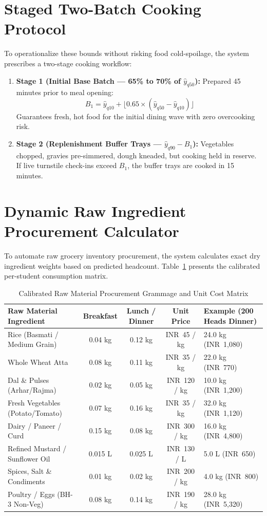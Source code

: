 \documentclass[11pt,a4paper,oneside]{report}
\newcommand{\inr}{\textsf{INR~}}
\begin{document}
\section{Staged Two-Batch Cooking Protocol}
To operationalize these bounds without risking food cold-spoilage, the system prescribes a two-stage cooking workflow:
\begin{enumerate}
  \item \textbf{Stage 1 (Initial Base Batch --- 65\% to 70\% of $\hat{y}_{q50}$):} Prepared 45 minutes prior to meal opening:
  $$B_1 = \hat{y}_{q10} + \lfloor 0.65 \times (\hat{y}_{q50} - \hat{y}_{q10}) \rfloor$$
  Guarantees fresh, hot food for the initial dining wave with zero overcooking risk.
  \item \textbf{Stage 2 (Replenishment Buffer Trays --- $\hat{y}_{q90} - B_1$):} Vegetables chopped, gravies pre-simmered, dough kneaded, but cooking held in reserve. If live turnstile check-ins exceed $B_1$, the buffer trays are cooked in 15 minutes.
\end{enumerate}

\section{Dynamic Raw Ingredient Procurement Calculator}
To automate raw grocery inventory procurement, the system calculates exact dry ingredient weights based on predicted headcount. Table~\ref{tab:procurement_recipe} presents the calibrated per-student consumption matrix.

\begin{table}[ht]
\centering
\small
\renewcommand{\arraystretch}{1.2}
\begin{tabularx}{\textwidth}{p{4.2cm}cccX}
\toprule
\rowcolor{bluelight}
\textbf{Raw Material Ingredient} & \textbf{Breakfast} & \textbf{Lunch / Dinner} & \textbf{Unit Price} & \textbf{Example (200 Heads Dinner)} \\
\midrule
Rice (Basmati / Medium Grain) & 0.04 kg & 0.12 kg & \inr 45 / kg & 24.0 kg (\inr 1,080) \\
Whole Wheat Atta & 0.08 kg & 0.11 kg & \inr 35 / kg & 22.0 kg (\inr 770) \\
Dal \& Pulses (Arhar/Rajma) & 0.02 kg & 0.05 kg & \inr 120 / kg & 10.0 kg (\inr 1,200) \\
Fresh Vegetables (Potato/Tomato) & 0.07 kg & 0.16 kg & \inr 35 / kg & 32.0 kg (\inr 1,120) \\
Dairy / Paneer / Curd & 0.15 kg & 0.08 kg & \inr 300 / kg & 16.0 kg (\inr 4,800) \\
Refined Mustard / Sunflower Oil & 0.015 L & 0.025 L & \inr 130 / L & 5.0 L (\inr 650) \\
Spices, Salt \& Condiments & 0.01 kg & 0.02 kg & \inr 200 / kg & 4.0 kg (\inr 800) \\
Poultry / Eggs (BH-3 Non-Veg) & 0.08 kg & 0.14 kg & \inr 190 / kg & 28.0 kg (\inr 5,320) \\
\bottomrule
\end{tabularx}
\caption{Calibrated Raw Material Procurement Grammage and Unit Cost Matrix}
\label{tab:procurement_recipe}
\end{table}
\end{document}
